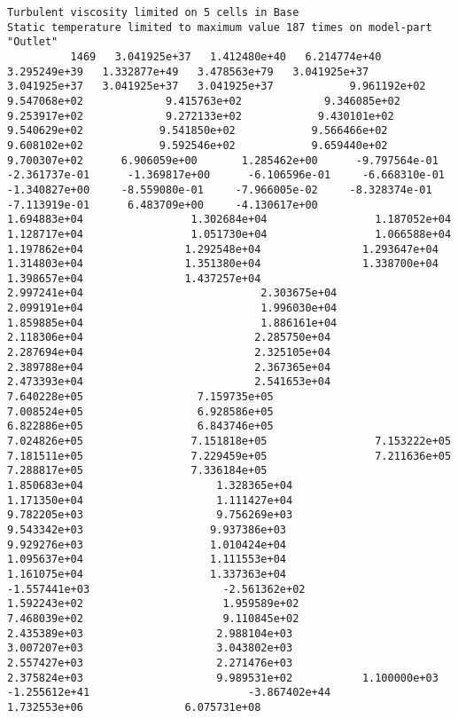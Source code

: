 \documentclass{article}
\begin{document}
{\tiny 
\begin{verbatim}
Turbulent viscosity limited on 5 cells in Base
Static temperature limited to maximum value 187 times on model-part "Outlet"
          1469   3.041925e+37   1.412480e+40   6.214774e+40   3.295249e+39   1.332877e+49   3.478563e+79   3.041925e+37   3.041925e+37   3.041925e+37   3.041925e+37            9.961192e+02             9.547068e+02             9.415763e+02             9.346085e+02             9.253917e+02             9.272133e+02            9.430101e+02            9.540629e+02            9.541850e+02            9.566466e+02            9.608102e+02            9.592546e+02            9.659440e+02            9.700307e+02      6.906059e+00       1.285462e+00      -9.797564e-01      -2.361737e-01      -1.369817e+00      -6.106596e-01     -6.668310e-01     -1.340827e+00     -8.559080e-01     -7.966005e-02     -8.328374e-01     -7.113919e-01      6.483709e+00     -4.130617e+00                1.694883e+04                 1.302684e+04                 1.187052e+04                 1.128717e+04                 1.051730e+04                 1.066588e+04                1.197862e+04                1.292548e+04                1.293647e+04                1.314803e+04                1.351380e+04                1.338700e+04                1.398657e+04                1.437257e+04                           2.997241e+04                            2.303675e+04                            2.099191e+04                            1.996030e+04                            1.859885e+04                            1.886161e+04                           2.118306e+04                           2.285750e+04                           2.287694e+04                           2.325105e+04                           2.389788e+04                           2.367365e+04                           2.473393e+04                           2.541653e+04                 7.640228e+05                  7.159735e+05                  7.008524e+05                  6.928586e+05                  6.822886e+05                  6.843746e+05                 7.024826e+05                 7.151818e+05                 7.153222e+05                 7.181511e+05                 7.229459e+05                 7.211636e+05                 7.288817e+05                 7.336184e+05                    1.850683e+04                     1.328365e+04                     1.171350e+04                     1.111427e+04                     9.782205e+03                     9.756269e+03                    9.543342e+03                    9.937386e+03                    9.929276e+03                    1.010424e+04                    1.095637e+04                    1.111553e+04                    1.161075e+04                    1.337363e+04                    -1.557441e+03                     -2.561362e+02                      1.592243e+02                      1.959589e+02                      7.468039e+02                      9.110845e+02                     2.435389e+03                     2.988104e+03                     3.007207e+03                     3.043802e+03                     2.557427e+03                     2.271476e+03                     2.375824e+03                     9.989531e+02           1.100000e+03      -1.255612e+41                         -3.867402e+44               1.732553e+06                6.075731e+08 

\end{verbatim}}
\end{document}
